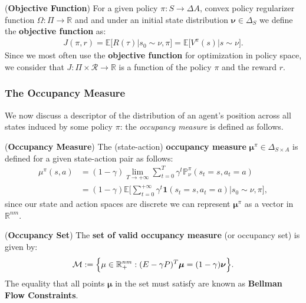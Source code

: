 \begin{definition}
    \label{def:obj_function}
    (\textbf{Objective Function})
    For a given policy $\pi:S\rightarrow \Delta A$, convex policy regularizer function $\Omega: \Pi \rightarrow \mathbb{R}$ and and under an initial state distribution $\bm{\nu} \in \Delta_S$ we define the \textbf{objective function} as:
    \begin{align*}
        J(\pi,r) = \mathbb{E}\Big[ R(\tau) \Big| s_0 \sim \nu, \pi \Big] =  \mathbb{E}\Big[ V^\pi(s) \Big| s \sim \nu\Big].
    \end{align*}
    Since we most often use the \textbf{objective function} for optimization in policy space, we consider that $J:\Pi \times \mathcal{R} \rightarrow \mathbb{R}$ is a function of the policy $\pi$ and the reward $r$.
\end{definition}

\subsubsection{The Occupancy Measure}
\label{sec:occupancy_measure}
We now discuss a descriptor of the distribution of an agent's position across all states induced by some policy $\pi$: the \textit{occupancy measure} is defined as follows.

\begin{definition}
    (\textbf{Occupancy Measure}) 
    The (state-action) \textbf{occupancy measure} $\bm{\mu}^\pi \in \Delta_{S \times A}$ is defined for a given state-action pair as follows:
    \begin{align*}
        \mu^\pi(s,a) &= (1-\gamma) \lim_{T \rightarrow + \infty} \sum_{t=0}^T \gamma^t \mathbb{P}_\nu^\pi(s_t=s,a_t=a) 
        \\
        &= (1-\gamma) \mathbb{E} \Big[ \sum_{t=0}^{+\infty} \gamma^t \mathbf{1}(s_t=s,a_t=a) \Big| s_0 \sim \nu, \pi\Big],
    \end{align*}
    since our state and action spaces are discrete we can represent $\bm{\mu}^{\pi}$ as a vector in $\mathbb{R}^{nm}$. 
\end{definition}

\begin{definition}
    \label{def:occupancy_set}
    (\textbf{Occupancy Set})
    The \textbf{set of valid occupancy measure} (or occupancy set) is given by:
    \begin{align*}
        \mathcal{M} := \Bigl\{ \mu \in \mathbb{R}_+^{nm} : (E-\gamma P)^T \bm{\mu} = (1-\gamma) \bm{\nu} \Bigr\}.
    \end{align*}
    The equality that all points $\bm{\mu}$ in the set must satisfy are known as \textbf{Bellman Flow Constraints}.
\end{definition}

